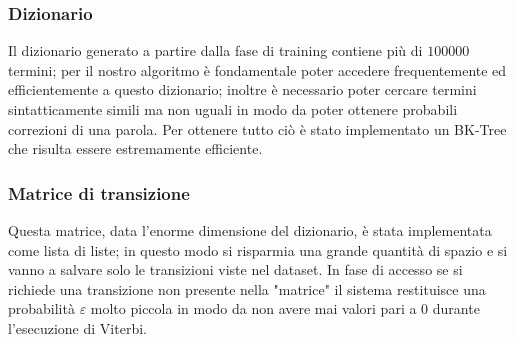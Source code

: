 \documentclass[a4paper,11pt]{article}
\begin{document}
        \subsubsection{Dizionario}
        	Il dizionario generato a partire dalla fase di training contiene più di $100000$ termini; per il nostro algoritmo è fondamentale
            poter accedere frequentemente ed efficientemente a questo dizionario; inoltre è necessario poter cercare termini sintatticamente simili ma non
            uguali in modo da poter ottenere probabili correzioni di una parola. Per ottenere tutto ciò è stato implementato un BK-Tree\cite{bktree} che risulta
            essere estremamente efficiente.
		\subsubsection{Matrice di transizione}
        	Questa matrice, data l'enorme dimensione del dizionario, è stata implementata come lista di liste; in questo modo si risparmia una grande
            quantità di spazio e si vanno a salvare solo le transizioni viste nel dataset. In fase di accesso se si richiede una transizione non
            presente nella "matrice" il sistema restituisce una probabilità $\varepsilon$ molto piccola in modo da non avere mai valori pari a 0 durante
            l'esecuzione di Viterbi.
\end{document}
